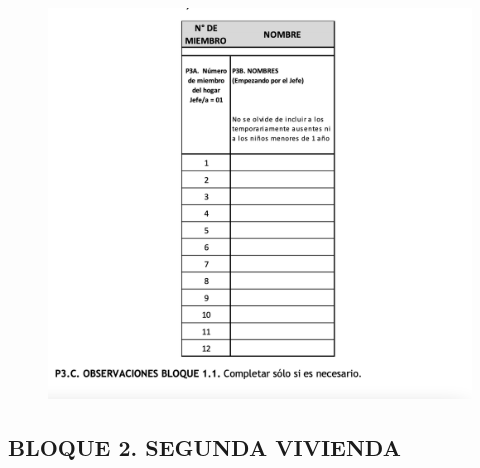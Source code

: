 \documentclass[
  openany]{book}
\begin{document}
\begin{figure}

{\centering \includegraphics[width=1\linewidth]{imagenes/figura6-154} 

}

\end{figure}

\hypertarget{bloque-2.-segunda-vivienda}{%
\subsection{\texorpdfstring{\textbf{BLOQUE 2. SEGUNDA VIVIENDA}}{BLOQUE 2. SEGUNDA VIVIENDA}}\label{bloque-2.-segunda-vivienda}}
\end{document}
